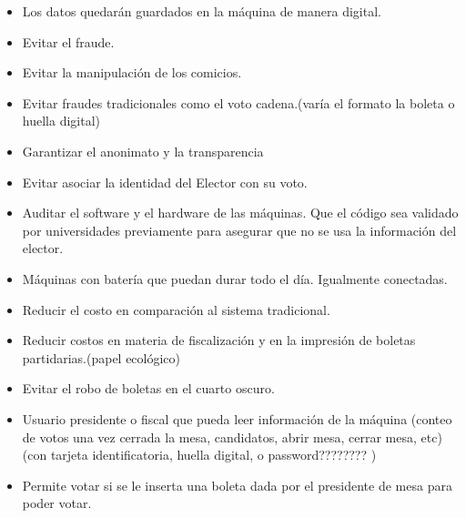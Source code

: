 \documentclass[spanish, 10pt,a4paper]{article}
\numberwithin{equation}{section} %
\begin{document}
\begin{itemize}
\item Los datos quedarán guardados en la máquina de manera digital.
\item Evitar el fraude.
\item Evitar la manipulación de los comicios.
\item Evitar fraudes tradicionales como el voto cadena.(varía el formato la boleta o huella digital)
\item Garantizar el anonimato y la transparencia
\item Evitar asociar la identidad del Elector con su voto.
\item Auditar el software y el hardware de las máquinas. Que el código sea validado por universidades previamente para asegurar que no se usa la información del elector.
\item Máquinas con batería que puedan durar todo el día. Igualmente conectadas.
\item Reducir el costo en comparación al sistema tradicional. 
\item Reducir costos en materia de fiscalización y en la impresión de boletas partidarias.(papel ecológico)
\item Evitar el robo de boletas en el cuarto oscuro. 
\item Usuario presidente o fiscal que pueda leer información de la máquina (conteo de votos una vez cerrada la mesa, candidatos, abrir mesa, cerrar mesa, etc) (con tarjeta identificatoria, huella digital,  o password???????? ) 
\item Permite votar si se le inserta una boleta dada por el presidente de mesa para poder votar. 
\end{itemize}
\end{document}
